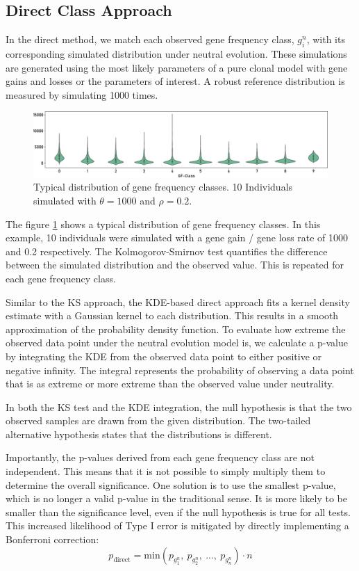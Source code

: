 \subsection{Direct Class Approach}
In the direct method, we match each observed gene frequency class, $g_i^n$, with its corresponding simulated distribution under neutral evolution.
These simulations are generated using the most likely parameters of a pure clonal model with gene gains and losses or the parameters of interest.
A robust reference distribution is measured by simulating 1000 times.
\begin{figure}[h]
    \centering
    \includegraphics[width=\textwidth]{figures/gfs.pdf}
    \caption[Typical Gene Frequency Spectrum.]{Typical distribution of gene frequency classes. 10 Individuals simulated with $\theta = 1000$ and $\rho = 0.2$.}
    \label{fig:typical-gfs}
\end{figure}

The figure \ref{fig:typical-gfs} shows a typical distribution of gene frequency classes.
In this example, 10 individuals were simulated with a gene gain / gene loss rate of 1000 and 0.2 respectively.
The Kolmogorov-Smirnov test quantifies the difference between the simulated distribution and the observed value.
This is repeated for each gene frequency class.

Similar to the \ac{KS} approach, the \ac{KDE}-based direct approach fits a kernel density estimate with a Gaussian kernel to each distribution.
This results in a smooth approximation of the probability density function.
To evaluate how extreme the observed data point under the neutral evolution model is, we calculate a p-value by integrating the \ac{KDE} from the observed data point to either positive or negative infinity.
The integral represents the probability of observing a data point that is as extreme or more extreme than the observed value under neutrality.

In both the \ac{KS} test and the \ac{KDE} integration, the null hypothesis is that the two observed samples are drawn from the given distribution.
The two-tailed alternative hypothesis states that the distributions is different.

Importantly, the p-values derived from each gene frequency class are not independent.
This means that it is not possible to simply multiply them to determine the overall significance.
One solution is to use the smallest p-value, which is no longer a valid p-value in the traditional sense.
It is more likely to be smaller than the significance level, even if the null hypothesis is true for all tests.
This increased likelihood of Type I error is mitigated by directly implementing a Bonferroni correction:
\begin{equation}
    p_{\text{direct}} = \text{min}(p_{g^n_1}, ~ p_{g^n_2}, ~ ..., ~ p_{g^n_n}) \cdot n
\end{equation}

